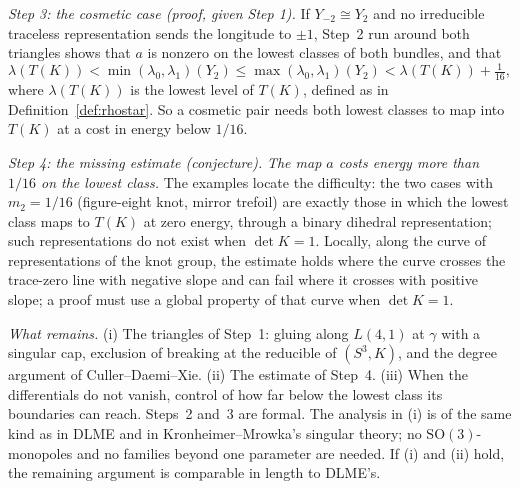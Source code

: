 \documentclass[10pt]{amsart}
\numberwithin{equation}{section}
\theoremstyle{compact}
\theoremstyle{definition}
\newcommand{\SO}{\mathrm{SO}}
\newcommand{\st}[1]{\par\noindent\textit{#1}\enspace}
\begin{document}
\st{Step 3: the cosmetic case (proof, given Step 1).} If $Y_{-2}\cong Y_2$
and no irreducible traceless representation sends the longitude to $\pm1$,
Step~2 run around both triangles shows that $a$ is nonzero on the lowest
classes of both bundles, and that
\[
\lambda(T(K))<\min(\lambda_0,\lambda_1)(Y_2)\le\max(\lambda_0,\lambda_1)(Y_2)
<\lambda(T(K))+\tfrac1{16},
\]
where $\lambda(T(K))$ is the lowest level of $T(K)$, defined as in
Definition~\ref{def:rhostar}. So a cosmetic pair needs both lowest classes to
map into $T(K)$ at a cost in energy below $1/16$.

\st{Step 4: the missing estimate (conjecture).} \emph{The map $a$ costs
energy more than $1/16$ on the lowest class.} The examples locate the
difficulty: the two cases with $m_2=1/16$ (figure-eight knot, mirror
trefoil) are exactly those in which the lowest class maps to $T(K)$ at zero
energy, through a binary dihedral representation; such representations do
not exist when $\det K=1$. Locally, along the curve of representations of
the knot group, the estimate holds where the curve crosses the trace-zero
line with negative slope and can fail where it crosses with positive slope;
a proof must use a global property of that curve when $\det K=1$.

\st{What remains.} (i) The triangles of Step~1: gluing along $L(4,1)$ at
$\gamma$ with a singular cap, exclusion of breaking at the reducible of
$(S^3,K)$, and the degree argument of Culler--Daemi--Xie. (ii) The estimate
of Step~4. (iii) When the differentials do not vanish, control of how far
below the lowest class its boundaries can reach. Steps~2 and~3 are formal.
The analysis in (i) is of the same kind as in DLME and in Kronheimer--Mrowka's
singular theory; no $\SO(3)$-monopoles and no families beyond one parameter
are needed. If (i) and (ii) hold, the remaining argument is comparable in
length to DLME's.
\end{document}
